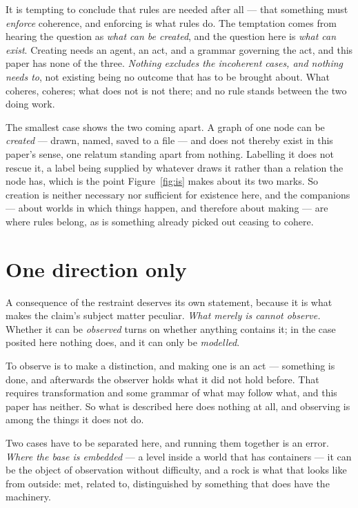 \documentclass[11pt,a4paper]{article}
\theoremstyle{remark}\newtheorem{remark}[proposition]{Remark}
\begin{document}
It is tempting to conclude that rules are needed after all --- that something must \emph{enforce}
coherence, and enforcing is what rules do. The temptation comes from hearing the question as \emph{what
can be created}, and the question here is \emph{what can exist}. Creating needs an agent, an act, and a
grammar governing the act, and this paper has none of the three. \emph{Nothing excludes the incoherent
cases, and nothing needs to}, not existing being no outcome that has to be brought about. What coheres,
coheres; what does not is not there; and no rule stands between the two doing work.

The smallest case shows the two coming apart. A graph of one node can be \emph{created} --- drawn,
named, saved to a file --- and does not thereby exist in this paper's sense, one relatum standing apart
from nothing. Labelling it does not rescue it, a label being supplied by whatever draws it rather than a
relation the node has, which is the point Figure~\ref{fig:is} makes about its two marks. So creation is
neither necessary nor sufficient for existence here, and the companions --- about worlds in which things
happen, and therefore about making --- are where rules belong, as is something already picked out
ceasing to cohere.

\section{One direction only}\label{sec:one-way}
A consequence of the restraint deserves its own statement, because it is what makes the claim's subject
matter peculiar. \emph{What merely is cannot observe.} Whether it can be \emph{observed} turns on whether anything
contains it; in the case posited here nothing does, and it can only be \emph{modelled}.

To observe is to make a distinction, and making one is an act --- something is done, and afterwards the
observer holds what it did not hold before. That requires transformation and some grammar of what may
follow what, and this paper has neither. So what is described here does nothing at all, and observing is
among the things it does not do.

Two cases have to be separated here, and running them together is an error. \emph{Where the base is
embedded} --- a level inside a world that has containers --- it can be the object of observation without
difficulty, and a rock is what that looks like from outside: met, related to, distinguished by something
that does have the machinery.
\end{document}
